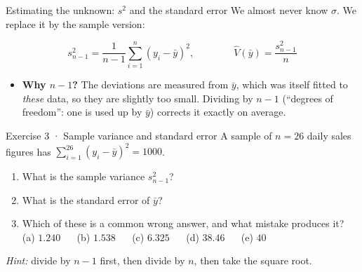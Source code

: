 \documentclass[
  11pt,
  ignorenonframetext,
  aspectratio=169,
]{beamer}
\providecommand{\tightlist}{%
  \setlength{\itemsep}{0pt}\setlength{\parskip}{0pt}}
\begin{document}
\begin{frame}{Estimating the unknown: \(s^2\) and the standard error}
\protect{}\label{estimating-the-unknown-s2-and-the-standard-error}
We almost never know \(\sigma\). We replace it by the sample version:

\[s_{n-1}^2=\frac{1}{n-1}\sum_{i=1}^n (y_i-\bar y)^2 ,\qquad\qquad \hat{V}(\bar y)=\frac{s^2_{n-1}}{n}\]

\begin{itemize}
\item
  \textbf{Why \(n-1\)?} The deviations are measured from \(\bar y\),
  which was itself fitted to \emph{these} data, so they are slightly too
  small. Dividing by \(n-1\) (``degrees of freedom'': one is used up by
  \(\bar y\)) corrects it exactly on average.
\end{itemize}
\end{frame}


\begin{frame}{Exercise 3 · Sample variance and standard error}
\protect{}\label{exercise-3-sample-variance-and-standard-error}
A sample of \(n=26\) daily sales figures has
\(\sum_{i=1}^{26}(y_i-\bar y)^2=1000\).

\begin{enumerate}
\tightlist
\item
  What is the sample variance \(s^2_{n-1}\)?
\item
  What is the standard error of \(\bar y\)?
\item
  Which of these is a common wrong answer, and what mistake produces it? \\
  (a) \(1.240\) \(\quad\) (b) \(1.538\) \(\quad\) (c)
  \(6.325\) \(\quad\) (d) \(38.46\) \(\quad\) (e) \(40\)
\end{enumerate}

\emph{Hint:} divide by \(n-1\) first, then divide by \(n\), then take
the square root.
\end{frame}
\end{document}
